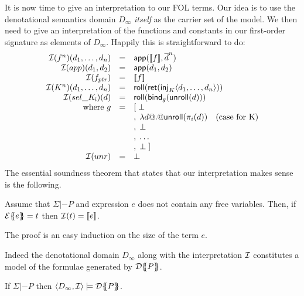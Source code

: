 It is now time to give an interpretation to our FOL terms. Our idea is to use the 
denotational semantics domain $D_\infty$ {\em itself} as the carrier set of the model. 
We then need to give an interpretation of the functions and constants in our first-order
signature as elements of $D_\infty$. Happily this is straightforward to do:
\[\begin{array}{rcl}
   {\cal I}(f^{n})(d_1,\ldots,d_n) & = & \mathsf{app}([\![f]\!],\overline{d}^{n}) \\ 
   {\cal I}(app)(d_1,d_2)     & = & \mathsf{app}(d_1,d_2) \\
   {\cal I}(f_{ptr})  & = & [\![f]\!] \\
   {\cal I}(K^{n})(d_1,\ldots,d_n) & = & \mathsf{roll}(\mathsf{ret}(\mathsf{inj}_{K}\langle d_1,\ldots,d_n\rangle)) \\ 
   {\cal I}(\mathop{sel\_K\!_{i}})(d) & = &  \mathsf{roll}(\mathsf{bind}_g(\mathsf{unroll}(d))) \\ 
     \mbox{where } g  & = & [\;\bot \\ 
                      &   & ,\;\mathsf{\lambda} d @.@ \mathsf{unroll}(\pi_i(d))  \quad (\mbox{case for K}) \\ 
                      &   & ,\;\bot \\
                      &   & ,\;\ldots\\
                      &   & ,\;\bot\; ] \\
  {\cal I}(unr)       & = & \bot 
\end{array}\]
The essential soundness theorem that states that our interpretation makes sense is
the following. 
\begin{theorem} 
Assume that $\Sigma |- P$ and expression $e$ does not contain any free variables. 
Then, if ${\cal E}\{\!\!\{e\}\!\!\} = t$ then ${\cal I}(t) = [\![e]\!]$.
\end{theorem}
The proof is an easy induction on the size of the term $e$.

Indeed the denotational domain $D_\infty$ along with the interpretation 
${\cal I}$ constitutes a model of the formulae generated by ${\cal D}\{\!\!\{P\}\!\!\}$. 

\begin{theorem}\label{thm:models-defs}
If $\Sigma |- P$ then $\langle D_{\infty},{\cal I}\rangle \models {\cal D}\{\!\!\{P\}\!\!\}$. 
\end{theorem}



